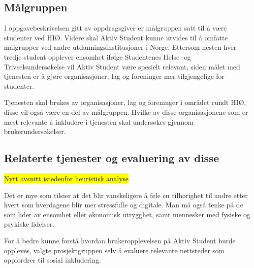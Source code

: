 \subsection{Målgruppen}
I oppgavebeskrivelsen gitt av oppdragsgiver er målgruppen satt til å være studenter ved HIØ. Videre skal Aktiv Student kunne utvides til å omfatte målgrupper ved andre utdanningsinstitusjoner i Norge. 
Ettersom nesten hver tredje student opplever ensomhet ifølge Studentenes Helse -og Trivselsundersøkelse \cite{SHOT:2} vil Aktiv Student være spesielt relevant, siden målet med tjenesten er å gjøre organisasjoner, lag og foreninger mer tilgjengelige for studenter.

Tjenesten skal brukes av organisasjoner, lag og foreninger i området rundt HIØ, disse vil også være en del av målgruppen. Hvilke av disse organisasjonene som er mest relevante å inkludere i tjenesten skal undersøkes gjennom brukerundersøkelser.

\subsection{Relaterte tjenester og evaluering av disse}
\label{section:relaterte-tjenester}
\hl{Nytt avsnitt istedenfor heuristisk analyse}

Det er mye som tilsier at det blir vanskeligere å føle en tilhørighet til andre etter hvert som hverdagene blir mer stressfulle og digitale. Man må også tenke på de som lider av ensomhet eller økonomisk utrygghet, samt mennesker med fysiske og psykiske lidelser.

\vspace{5mm} %

For å bedre kunne forstå hvordan brukeropplevelsen på Aktiv Student burde oppleves, valgte prosjektgruppen selv å evaluere relevante nettsteder som oppfordrer til sosial inkludering. 

\vspace{5mm} %

